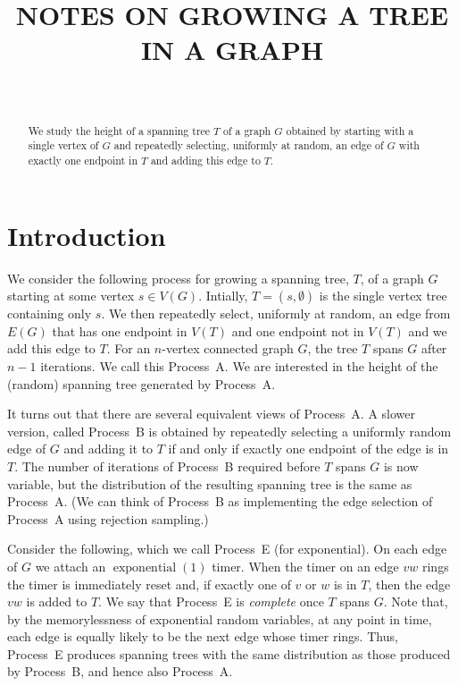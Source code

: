 \documentclass[lotsofwhite]{patmorin}
\title{\MakeUppercase{Notes on Growing a Tree in a Graph}}
\author{\ }
\DeclareMathOperator{\exponential}{exponential}
\begin{document}
\maketitle

\begin{abstract}
We study the height of a spanning tree $T$ of a graph $G$ obtained by
starting with a single vertex of $G$ and repeatedly selecting, uniformly
at random, an edge of $G$ with exactly one endpoint in $T$ and adding
this edge to $T$.
\end{abstract}

\tableofcontents
\newpage

\section{Introduction}

We consider the following process for growing a spanning tree,
$T$, of a graph $G$ starting at some vertex $s\in V(G)$.  Intially,
$T=(s,\emptyset)$ is the single vertex tree containing only $s$. We then
repeatedly select, uniformly at random, an edge from $E(G)$ that has one
endpoint in $V(T)$ and one endpoint not in $V(T)$ and we add this edge
to $T$.  For an $n$-vertex connected graph $G$, the tree $T$ spans $G$
after $n-1$ iterations.  We call this Process~A.  We are interested in the
height of the (random) spanning tree generated by Process~A.

It turns out that there are several equivalent views of Process~A.
A slower version, called Process~B is obtained by repeatedly selecting
a uniformly random edge of $G$ and adding it to $T$ if and only if
exactly one endpoint of the edge is in $T$.  The number of iterations
of Process~B required before $T$ spans $G$ is now variable, but the
distribution of the resulting spanning tree is the same as Process~A.
(We can think of Process~B as implementing the edge selection of Process~A
using rejection sampling.)

Consider the following, which we call Process~E (for exponential).
On each edge of $G$ we attach an $\exponential(1)$ timer.  When the
timer on an edge $vw$ rings the timer is immediately reset and, if
exactly one of $v$ or $w$ is in $T$, then the edge $vw$ is added to $T$.
We say that Process~E is \emph{complete} once $T$ spans $G$.  Note that,
by the memorylessness of exponential random variables, at any point in
time, each edge is equally likely to be the next edge whose timer rings.
Thus, Process~E produces spanning trees with the same distribution as
those produced by Process~B, and hence also Process~A.
\end{document}
